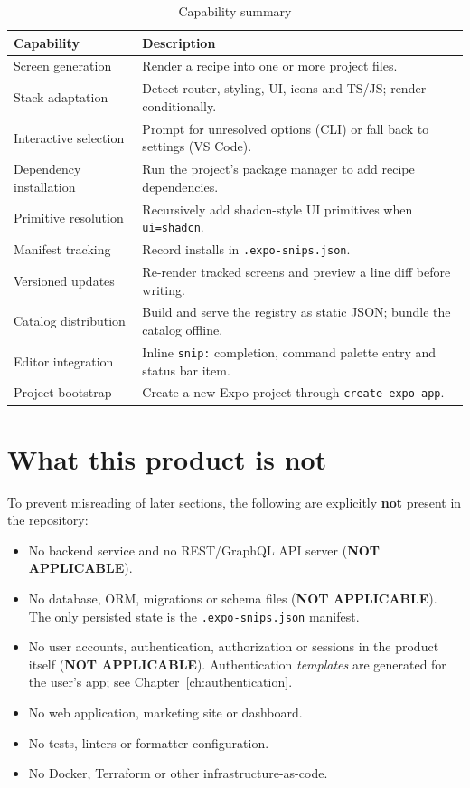 \begin{longtable}{p{4.6cm}p{9.8cm}}
\caption{Capability summary}\\
\toprule
\textbf{Capability} & \textbf{Description} \\
\midrule

Screen generation & Render a recipe into one or more project files. \\
Stack adaptation & Detect router, styling, UI, icons and TS/JS; render conditionally. \\
Interactive selection & Prompt for unresolved options (CLI) or fall back to settings (VS Code). \\
Dependency installation & Run the project's package manager to add recipe dependencies. \\
Primitive resolution & Recursively add shadcn-style UI primitives when \texttt{ui=shadcn}. \\
Manifest tracking & Record installs in \texttt{.expo-snips.json}. \\
Versioned updates & Re-render tracked screens and preview a line diff before writing. \\
Catalog distribution & Build and serve the registry as static JSON; bundle the catalog offline. \\
Editor integration & Inline \texttt{snip:} completion, command palette entry and status bar item. \\
Project bootstrap & Create a new Expo project through \texttt{create-expo-app}. \\
\bottomrule
\end{longtable}

\section{What this product is not}

To prevent misreading of later sections, the following are explicitly \textbf{not}
present in the repository:

\begin{itemize}
  \item No backend service and no REST/GraphQL API server
        (\textbf{NOT APPLICABLE}).
  \item No database, ORM, migrations or schema files
        (\textbf{NOT APPLICABLE}). The only persisted state is the
        \texttt{.expo-snips.json} manifest.
  \item No user accounts, authentication, authorization or sessions in the product
        itself (\textbf{NOT APPLICABLE}). Authentication \emph{templates} are
        generated for the user's app; see Chapter~\ref{ch:authentication}.
  \item No web application, marketing site or dashboard.
  \item No tests, linters or formatter configuration.
  \item No Docker, Terraform or other infrastructure-as-code.
\end{itemize}

